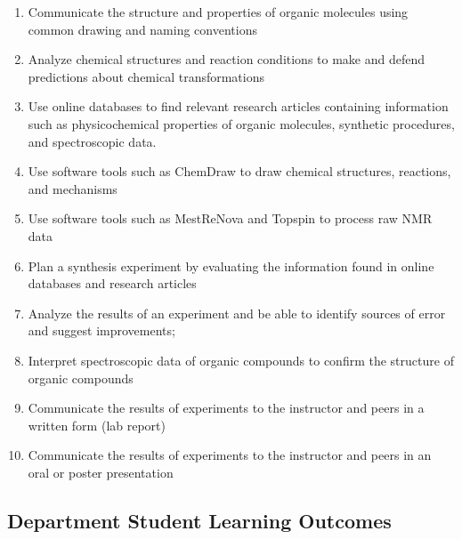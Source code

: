 \begin{enumerate}
\def\labelenumi{\arabic{enumi}.}
\tightlist
\item
  Communicate the structure and properties of organic molecules using
  common drawing and naming conventions
\item
  Analyze chemical structures and reaction conditions to make and defend
  predictions about chemical transformations
\item
  Use online databases to find relevant research articles containing
  information such as physicochemical properties of organic molecules,
  synthetic procedures, and spectroscopic data.
\item
  Use software tools such as ChemDraw to draw chemical structures,
  reactions, and mechanisms
\item
  Use software tools such as MestReNova and Topspin to process raw NMR
  data
\item
  Plan a synthesis experiment by evaluating the information found in
  online databases and research articles 
\item
  Analyze the results of an experiment and be able to identify sources
  of error and suggest improvements;
\item
  Interpret spectroscopic data of organic compounds to confirm the
  structure of organic compounds
\item
  Communicate the results of experiments to the instructor and peers in
  a written form (lab report)
\item
  Communicate the results of experiments to the instructor and peers in
  an oral or poster presentation
\end{enumerate}

\hypertarget{department-student-learning-outcomes}{%
\subsection{Department Student Learning
Outcomes}\label{department-student-learning-outcomes}}

